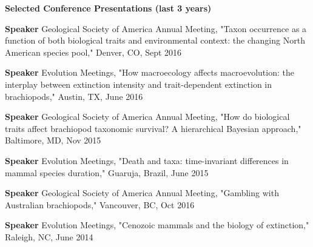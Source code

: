 \documentclass[letterpaper,11pt]{article}
\newcommand{\resheading}[1]{{\large \colorbox{mygrey}{\begin{minipage}{\textwidth}{\textbf{#1 \vphantom{p\^{E}}}}\end{minipage}}}}
\begin{document}
\resheading{Selected Conference Presentations (last 3 years)}
  \begin{description}
    \item {\bf Speaker} Geological Society of America Annual Meeting, "Taxon occurrence as a function of both biological traits and environmental context: the changing North American species pool," Denver, CO, Sept 2016
    \item {\bf Speaker} Evolution Meetings, "How macroecology affects macroevolution: the interplay between extinction intensity and trait-dependent extinction in brachiopods," Austin, TX, June 2016
    \item {\bf Speaker} Geological Society of America Annual Meeting, "How do biological traits affect brachiopod taxonomic survival? A hierarchical Bayesian approach," Baltimore, MD, Nov 2015
    \item {\bf Speaker} Evolution Meetings, "Death and taxa: time-invariant differences in mammal species duration," Guaruja, Brazil, June 2015
    \item {\bf Speaker} Geological Society of America Annual Meeting, "Gambling with Australian brachiopods," Vancouver, BC, Oct 2016
    \item {\bf Speaker} Evolution Meetings, "Cenozoic mammals and the biology of extinction," Raleigh, NC, June 2014
  \end{description}
\end{document}
